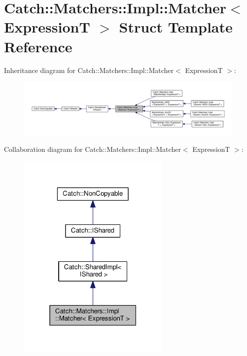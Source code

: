 \hypertarget{structCatch_1_1Matchers_1_1Impl_1_1Matcher}{}\section{Catch\+:\+:Matchers\+:\+:Impl\+:\+:Matcher$<$ ExpressionT $>$ Struct Template Reference}
\label{structCatch_1_1Matchers_1_1Impl_1_1Matcher}


Inheritance diagram for Catch\+:\+:Matchers\+:\+:Impl\+:\+:Matcher$<$ ExpressionT $>$\+:
\nopagebreak
\begin{figure}[H]
\begin{center}
\leavevmode
\includegraphics[width=350pt]{structCatch_1_1Matchers_1_1Impl_1_1Matcher__inherit__graph}
\end{center}
\end{figure}


Collaboration diagram for Catch\+:\+:Matchers\+:\+:Impl\+:\+:Matcher$<$ ExpressionT $>$\+:
\nopagebreak
\begin{figure}[H]
\begin{center}
\leavevmode
\includegraphics[width=211pt]{structCatch_1_1Matchers_1_1Impl_1_1Matcher__coll__graph}
\end{center}
\end{figure}
